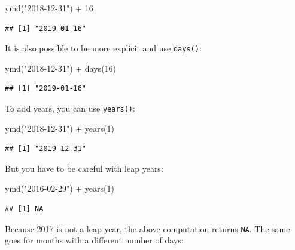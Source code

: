 \documentclass[
]{article}
\newenvironment{Shaded}{\begin{snugshade}}{\end{snugshade}}
\newcommand{\DecValTok}[1]{\textcolor[rgb]{0.00,0.00,0.81}{#1}}
\newcommand{\FunctionTok}[1]{\textcolor[rgb]{0.00,0.00,0.00}{#1}}
\newcommand{\NormalTok}[1]{#1}
\newcommand{\SpecialCharTok}[1]{\textcolor[rgb]{0.00,0.00,0.00}{#1}}
\newcommand{\StringTok}[1]{\textcolor[rgb]{0.31,0.60,0.02}{#1}}
\begin{document}
\begin{Shaded}
\begin{Highlighting}[]
\FunctionTok{ymd}\NormalTok{(}\StringTok{"2018{-}12{-}31"}\NormalTok{) }\SpecialCharTok{+} \DecValTok{16}
\end{Highlighting}
\end{Shaded}

\begin{verbatim}
## [1] "2019-01-16"
\end{verbatim}

It is also possible to be more explicit and use \texttt{days()}:

\begin{Shaded}
\begin{Highlighting}[]
\FunctionTok{ymd}\NormalTok{(}\StringTok{"2018{-}12{-}31"}\NormalTok{) }\SpecialCharTok{+} \FunctionTok{days}\NormalTok{(}\DecValTok{16}\NormalTok{)}
\end{Highlighting}
\end{Shaded}

\begin{verbatim}
## [1] "2019-01-16"
\end{verbatim}

To add years, you can use \texttt{years()}:

\begin{Shaded}
\begin{Highlighting}[]
\FunctionTok{ymd}\NormalTok{(}\StringTok{"2018{-}12{-}31"}\NormalTok{) }\SpecialCharTok{+} \FunctionTok{years}\NormalTok{(}\DecValTok{1}\NormalTok{)}
\end{Highlighting}
\end{Shaded}

\begin{verbatim}
## [1] "2019-12-31"
\end{verbatim}

But you have to be careful with leap years:

\begin{Shaded}
\begin{Highlighting}[]
\FunctionTok{ymd}\NormalTok{(}\StringTok{"2016{-}02{-}29"}\NormalTok{) }\SpecialCharTok{+} \FunctionTok{years}\NormalTok{(}\DecValTok{1}\NormalTok{)}
\end{Highlighting}
\end{Shaded}

\begin{verbatim}
## [1] NA
\end{verbatim}

Because 2017 is not a leap year, the above computation returns \texttt{NA}. The same goes for months with
a different number of days:
\end{document}
